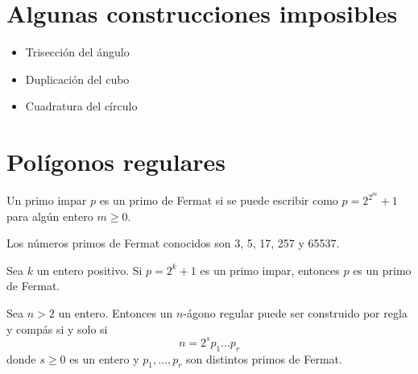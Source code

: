\section{Algunas construcciones imposibles}
\begin{itemize}
    \item Trisección del ángulo
    \item Duplicación del cubo
    \item Cuadratura del círculo
\end{itemize}

\section{Polígonos regulares}

\begin{definition}
    Un primo impar $p$ es un primo de Fermat si se puede escribir como $p = 2^{2^m}+1$ para algún entero $m \geq 0$.
\end{definition}

\begin{example}
    Los números primos de Fermat conocidos son 3, 5, 17, 257 y 65537.
\end{example}

\begin{lemma}
    Sea $k$ un entero positivo. Si $p = 2^k+1$ es un primo impar, entonces $p$ es un primo de Fermat.
\end{lemma}

\begin{theorem}
    Sea $n > 2$ un entero. Entonces un $n$-ágono regular puede ser construido por regla y compás si y solo si
    $$n = 2^s p_1 \dots p_r$$
    donde $s \geq 0$ es un entero y $p_1, \dots, p_r$ son distintos primos de Fermat.
\end{theorem}